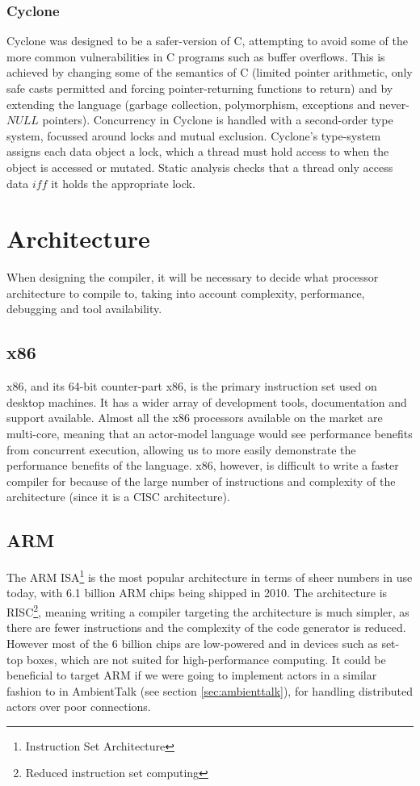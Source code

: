 \documentclass[pdftex,12pt,a4paper]{article}
\begin{document}
\subsubsection{Cyclone}

Cyclone was designed to be a safer-version of C, attempting to avoid some of the more common vulnerabilities in C programs such as buffer overflows.
This is achieved by changing some of the semantics of C (limited pointer arithmetic, only safe casts permitted and forcing pointer-returning functions to return) and by extending the language (garbage collection, polymorphism, exceptions and never-$NULL$ pointers).
Concurrency in Cyclone is handled with a second-order type system, focussed around locks and mutual exclusion.
Cyclone's type-system assigns each data object a lock, which a thread must hold access to when the object is accessed or mutated.
Static analysis checks that a thread only access data $iff$ it holds the appropriate lock.

\newpage
\section{Architecture}

When designing the compiler, it will be necessary to decide what processor architecture to compile to, taking into account complexity, performance, debugging and tool availability.

\subsection{x86}

x86, and its 64-bit counter-part x86, is the primary instruction set used on desktop machines. It has a wider array of development tools, documentation and support available.
Almost all the x86 processors available on the market are multi-core, meaning that an actor-model language would see performance benefits from concurrent execution, allowing us to more easily demonstrate the performance benefits of the language.
x86, however, is difficult to write a faster compiler for because of the large number of instructions and complexity of the architecture (since it is a CISC architecture).

\subsection{ARM}

The ARM ISA\footnote{Instruction Set Architecture} is the most popular architecture in terms of sheer numbers in use today, with 6.1 billion ARM chips being shipped in 2010\cite{theregister2011}.
The architecture is RISC\footnote{Reduced instruction set computing}, meaning writing a compiler targeting the architecture is much simpler, as there are fewer instructions and the complexity of the code generator is reduced.
However most of the 6 billion chips are low-powered and in devices such as set-top boxes, which are not suited for high-performance computing. It could be beneficial to target ARM if we were going to implement actors in a similar fashion to in AmbientTalk (see section \ref{sec:ambienttalk}), for handling distributed actors over poor connections.
\end{document}
